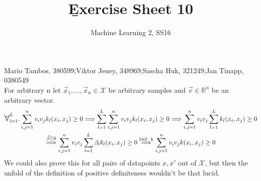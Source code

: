 \documentclass[a4paper]{article}
\newcommand{\1}{\mathds{1}}
\newcommand\bigforall{\mbox{\Large $\mathsurround0pt\forall$}}
\begin{document}
\title{\b{Exercise Sheet 10}}
\author{Machine Learning 2, SS16}

\maketitle

Mario Tambos, 380599;\quad Viktor Jeney, 348969;\quad Sascha Huk, 321249;\quad Jan Tinapp, 0380549\\

For arbitrary n let $\vec{x}_1, \ldots, \vec{x}_n \in \mathcal{X}$ be arbitrary samples 
and $\vec{v}\in\mathbb{R}^n$ be an arbitrary vector.
\begin{gather*}
	\bigforall_{l=1}^L. \sum_{i,j=1}^n v_i v_j k_l(x_i, x_j) \geq 0 
	\Longrightarrow
	\sum_{l=1}^L\sum_{i,j=1}^n v_i v_j k_l(x_i, x_j) \geq 0
	\Longrightarrow
	\sum_{i,j=1}^n v_i v_j \sum_{l=1}^L k_l(x_i, x_j) \geq 0 \\
	\stackrel{\vec{\beta}\geqq 0}{\Longrightarrow}
	\sum_{i,j=1}^n v_i v_j \sum_{l=1}^L \beta_l k_l(x_i, x_j) \geq 0
	\stackrel{\text{Def. k}}{\Longrightarrow}
	\sum_{i,j=1}^n v_i v_j k(x_i, x_j) \geq 0	
\end{gather*}
We could also prove this for all pairs of datapoints $x, x'$ out of $\mathcal{X}$, but then the unfold of the 
definition of positive definiteness wouldn't be that lucid.
\end{document}

